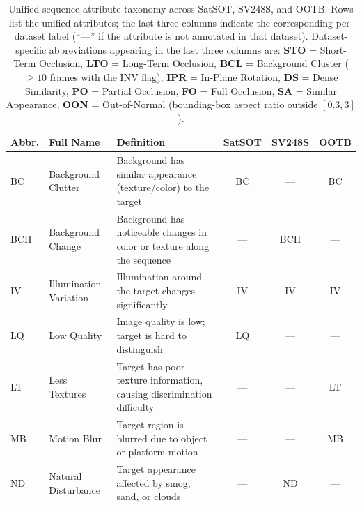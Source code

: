 
\begin{table}[t]
\centering
\caption{Unified sequence-attribute taxonomy across SatSOT, SV248S, and OOTB.
Rows list the unified attributes; the last three columns indicate the
corresponding per-dataset label (``---'' if the attribute is not annotated
in that dataset). Dataset-specific abbreviations appearing in the last
three columns are:
\textbf{STO} = Short-Term Occlusion,
\textbf{LTO} = Long-Term Occlusion,
\textbf{BCL} = Background Cluster ($\geq 10$ frames with the INV flag),
\textbf{IPR} = In-Plane Rotation,
\textbf{DS} = Dense Similarity,
\textbf{PO} = Partial Occlusion,
\textbf{FO} = Full Occlusion,
\textbf{SA} = Similar Appearance,
\textbf{OON} = Out-of-Normal (bounding-box aspect ratio outside $[0.3, 3]$).}
\label{tab:unified_attributes}
\small
\setlength{\tabcolsep}{4pt}
\renewcommand{\arraystretch}{1.15}
\begin{tabular}{llp{7.4cm}ccc}
\toprule
\textbf{Abbr.} & \textbf{Full Name} & \textbf{Definition} & \textbf{SatSOT} & \textbf{SV248S} & \textbf{OOTB} \\
\midrule
BC   & Background Clutter         & Background has similar appearance (texture/color) to the target & BC  & --- & BC  \\
BCH  & Background Change          & Background has noticeable changes in color or texture along the sequence & --- & BCH & --- \\
IV   & Illumination Variation     & Illumination around the target changes significantly & IV  & IV  & IV  \\
LQ   & Low Quality                & Image quality is low; target is hard to distinguish & LQ  & --- & --- \\
LT   & Less Textures              & Target has poor texture information, causing discrimination difficulty & --- & --- & LT  \\
MB   & Motion Blur                & Target region is blurred due to object or platform motion & --- & --- & MB  \\
ND   & Natural Disturbance        & Target appearance affected by smog, sand, or clouds & --- & ND  & --- \\

\end{tabular}
\end{table}

